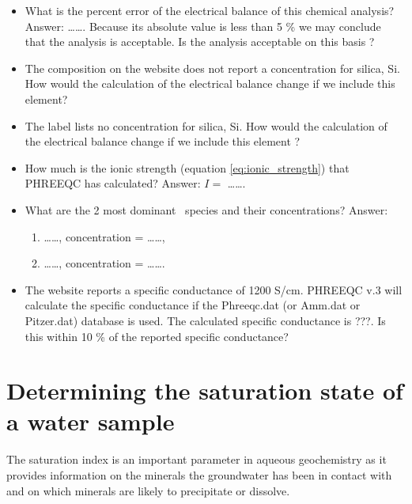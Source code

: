 \begin{itemize}

\item What is the percent error of the electrical balance of this chemical analysis? Answer: \ldots\ldots. Because its absolute value is less than 5 \% we may conclude that the analysis is acceptable. Is the analysis acceptable on this basis ?

\item The composition on the website does not report a concentration for silica, Si. How would the calculation of the electrical balance change if we include this element?

\item The label lists no concentration for silica, Si. How would the calculation of the electrical balance change if we include this element ?

\item How much is the ionic strength (equation \ref{eq:ionic_strength}) that PHREEQC has calculated? Answer: $I =$ \ldots\ldots.

\item What are the 2 most dominant \ca\ species and their concentrations? Answer: 

\begin{enumerate}
\item \ldots\ldots, concentration = \ldots\ldots, 

\item \ldots\ldots, concentration = \ldots\ldots.
\end{enumerate}


\item The website reports a specific conductance of 1200 \micro S/cm.  
PHREEQC v.3 will calculate the specific conductance 
if the Phreeqc.dat (or Amm.dat or Pitzer.dat) database is used.  
The calculated specific conductance is ???.
Is this within 10 \% of the reported specific conductance?

\end{itemize}


\newpage

\section{Determining the saturation state of a water sample}

The saturation index is an important parameter in aqueous geochemistry as it provides information on the minerals the groundwater has been in contact with and on which minerals are likely to precipitate or dissolve.


